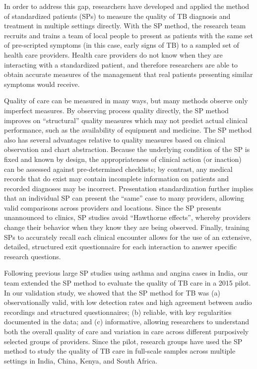 \documentclass[fleqn,10pt]{wlscirep}
\begin{document}
In order to address this gap, researchers have developed and applied the method of standardized patients (SPs) to measure the quality of TB diagnosis and treatment in multiple settings directly. With the SP method, the research team recruits and trains a team of local people to present as patients with the same set of pre-scripted symptoms (in this case, early signs of TB) to a sampled set of health care providers.\cite{das2015use} Health care providers do not know when they are interacting with a standardized patient, and therefore researchers are able to obtain accurate measures of the management that real patients presenting similar symptoms would receive.

Quality of care can be measured in many ways, but many methods observe only imperfect measures. By observing process quality directly, the SP method improves on ``structural'' quality measures which may not predict actual clinical performance, such as the availability of equipment and medicine.\cite{das2007variations} The SP method also has several advantages relative to quality measures based on clinical observation and chart abstraction. Because the underlying condition of the SP is fixed and known by design, the appropriateness of clinical action (or inaction) can be assessed against pre-determined checklists; by contrast, any medical records that do exist may contain incomplete information on patients and recorded diagnoses may be incorrect. Presentation standardization further implies that an individual SP can present the ``same'' case to many providers, allowing valid comparisons across providers and locations. Since the SP presents unannounced to clinics, SP studies avoid ``Hawthorne effects'', whereby providers change their behavior when they know they are being observed.\cite{leonard2006outpatient,das2015use} Finally, training SPs to accurately recall each clinical encounter allows for the use of an extensive, detailed, structured exit questionnaire for each interaction to answer specific research questions.

Following previous large SP studies using asthma and angina cases in India,\cite{das2012urban,das2016quality} our team extended the SP method to evaluate the quality of TB care in a 2015 pilot.\cite{das2015use,heap2019} In our validation study, we showed that the SP method for TB was (a) observationally valid, with low detection rates and high agreement between audio recordings and structured questionnaires; (b) reliable, with key regularities documented in the data; and (c) informative, allowing researchers to understand both the overall quality of care and variation in care across different purposively selected groups of providers. Since the pilot, research groups have used the SP method to study the quality of TB care in full-scale samples across multiple settings in India, China, Kenya, and South Africa. \cite{daniels2017use,kwan2018variations,sylvia2017tuberculosis,das2015use,christian2018measuring}
\end{document}
